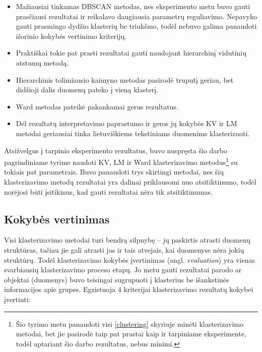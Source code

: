 \documentclass{VUMIFInfBakalaurinis}
\begin{document}
\begin{itemize}
\item
  Mažiausiai tinkamas DBSCAN metodas, nes eksperimento metu buvo gauti
  prasčiausi rezultatai ir reikalavo daugiausia parametrų reguliavimo.
  Nepavyko gauti prasmingo dydžio klasterių be triukšmo, todėl nebuvo
  galima panaudoti išorinio kokybės vertinimo kriterijų.
\item
  Praktiškai tokie pat prasti rezultatai gauti naudojant hierarchinį
  vidutinių atstumų metodą.
\item
  Hierarchinis tolimiausio kaimyno metodas pasirodė truputį geriau, bet
  didžioji dalis duomenų pateko į vieną klasterį.
\item
  Ward metodas pateikė pakankamai gerus rezultatus.
\item
  Dėl rezultatų interpretavimo paprastumo ir geros jų kokybės KV ir LM metodai geriausiai tinka lietuviškiems
  tekstiniams duomenims klasterizuoti.
\end{itemize}

Atsižvelgus į tarpinio eksperimento rezultatus, buvo nuspręsta šio darbo
pagrindiniame tyrime naudoti KV, LM ir Ward klasterizavimo
metodus\footnote{Šio tyrimo metu panaudoti visi \ref{clustering} skyriuje minėti klasterizavimo
  metodai, bet jie pasirodė taip pat prastai kaip ir tarpiniame
  eksperimente, todėl aptariant šio darbo rezultatus, nebus minimi.} su
tokiais pat parametrais. Buvo panaudoti trys skirtingi metodai, nes šių
klasterizavimo metodų rezultatai yra dalinai priklausomi nuo
atsitiktinumo, todėl norėjosi būti įsitikinus, kad gauti rezultatai nėra
tik atsitiktinumas.

\subsection{Kokybės vertinimas}\label{eval}

Visi klasterizavimo metodai turi bendrą silpnybę -- jų paskirtis atrasti
duomenų struktūras, tačiau jie gali atrasti jas ir tais atvejais, kai
duomenyse nėra jokių struktūrų. Todėl klasterizavimo kokybės įvertinimas
(angl. \emph{evaluation}) yra vienas svarbiausių klasterizavimo proceso
etapų. Jo metu gauti rezultatai parodo ar objektai (duomenys) buvo
teisingai sugrupuoti į klasterius be išankstinės informacijos apie
grupes. Egzistuoja 4 kriterijai klasterizavimo rezultatų kokybei
įvertinti:
\end{document}
